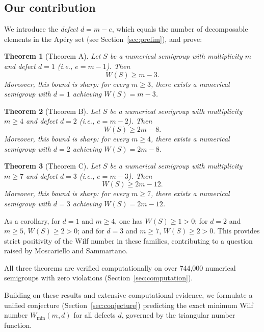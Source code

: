 \documentclass[11pt]{amsart}
\newtheorem{theorem}{Theorem}[section]
\theoremstyle{definition}
\theoremstyle{remark}
\begin{document}
\subsection{Our contribution}

We introduce the \emph{defect} $d = m - e$, which equals the number of
decomposable elements in the Ap\'ery set (see Section~\ref{sec:prelim}),
and prove:

\begin{theorem}[Theorem A]\label{thm:A-intro}
Let $S$ be a numerical semigroup with multiplicity $m$ and defect $d = 1$
(i.e., $e = m - 1$).  Then
\[
  W(S) \ge m - 3.
\]
Moreover, this bound is sharp: for every $m \ge 3$, there exists a
numerical semigroup with $d = 1$ achieving $W(S) = m - 3$.
\end{theorem}

\begin{theorem}[Theorem B]\label{thm:B-intro}
Let $S$ be a numerical semigroup with multiplicity $m \ge 4$ and defect $d = 2$
(i.e., $e = m - 2$).  Then
\[
  W(S) \ge 2m - 8.
\]
Moreover, this bound is sharp: for every $m \ge 4$, there exists a
numerical semigroup with $d = 2$ achieving $W(S) = 2m - 8$.
\end{theorem}

\begin{theorem}[Theorem C]\label{thm:C-intro}
Let $S$ be a numerical semigroup with multiplicity $m \ge 7$ and defect $d = 3$
(i.e., $e = m - 3$).  Then
\[
  W(S) \ge 2m - 12.
\]
Moreover, this bound is sharp: for every $m \ge 7$, there exists a
numerical semigroup with $d = 3$ achieving $W(S) = 2m - 12$.
\end{theorem}

As a corollary, for $d = 1$ and $m \ge 4$, one has $W(S) \ge 1 > 0$;
for $d = 2$ and $m \ge 5$, $W(S) \ge 2 > 0$;
and for $d = 3$ and $m \ge 7$, $W(S) \ge 2 > 0$.
This provides strict positivity of the Wilf number in these families,
contributing to a question raised by Moscariello and Sammartano.

All three theorems are verified computationally on over 744{,}000 numerical semigroups
with zero violations (Section~\ref{sec:computation}).

Building on these results and extensive computational evidence, we formulate a
unified conjecture (Section~\ref{sec:conjecture}) predicting the exact minimum
Wilf number $W_{\min}(m, d)$ for all defects $d$,
governed by the triangular number function.

\end{document}
